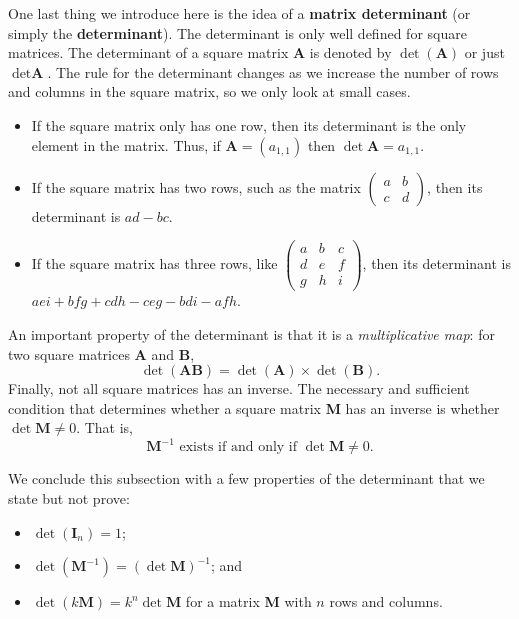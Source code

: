 One last thing we introduce here is the idea of a \textbf{matrix determinant} (or simply the \textbf{determinant}). The determinant is only well defined for square matrices. The determinant of a square matrix \textbf{A} is denoted by $\det(\textbf{A})$ or just $\det \textbf{A}$. The rule for the determinant changes as we increase the number of rows and columns in the square matrix, so we only look at small cases.
\begin{itemize}
    \item If the square matrix only has one row, then its determinant is the only element in the matrix. Thus, if $\textbf{A} = (a_{1,1})$ then $\det \textbf{A} = a_{1,1}$.
    \item If the square matrix has two rows, such as the matrix $\begin{pmatrix}a & b\\c & d\end{pmatrix}$, then its determinant is $ad-bc$.
    \item If the square matrix has three rows, like $\begin{pmatrix}a & b & c \\ d & e & f \\ g & h & i\end{pmatrix}$, then its determinant is $aei+bfg+cdh-ceg-bdi-afh$.
\end{itemize}
An important property of the determinant is that it is a \textit{multiplicative map}: for two square matrices \textbf{A} and \textbf{B},
\[
    \det (\textbf{AB}) = \det(\textbf{A}) \times \det(\textbf{B}).
\]
Finally, not all square matrices has an inverse. The necessary and sufficient condition that determines whether a square matrix \textbf{M} has an inverse is whether $\det \textbf{M} \neq 0$. That is,
\[
    \textbf{M}^{-1} \text{ exists if and only if } \det \textbf{M} \neq 0.
\]

We conclude this subsection with a few properties of the determinant that we state but not prove:
\begin{itemize}
    \item $\det(\textbf{I}_n) = 1$;
    \item $\det(\textbf{M}^{-1}) = \left(\det \textbf{M}\right)^{-1}$; and
    \item $\det(k\textbf{M}) = k^n \det\textbf{M}$ for a matrix \textbf{M} with $n$ rows and columns.
\end{itemize}

